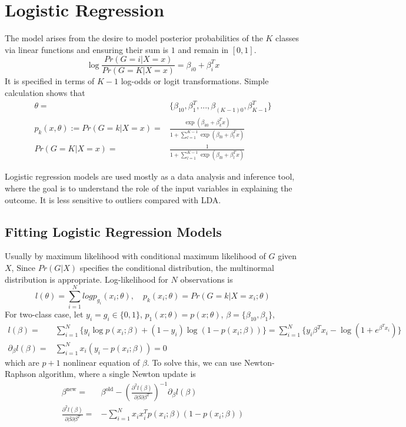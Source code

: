 \section{Logistic Regression}
The model arises from the desire to model posterior probabilities of the $K$ classes
via linear functions and ensuring their sum is $1$ and remain in $[0,1]$. 
\begin{equation*}
\log\frac{Pr(G=i|X=x)}{Pr(G=K|X=x)}=\beta_{i0}+\beta_i^Tx
\end{equation*}
It is specified in terms of $K-1$ log-odds or logit transformations. Simple calculation
shows that
\begin{align*}
\theta=&\{\beta_{10}, \beta_1^T, ..., \beta_{(K-1)0}, \beta_{K-1}^T\}\\
p_k(x,\theta):=Pr(G=k|X=x)=&\frac{\exp(\beta_{k0}+\beta_k^Tx)}{1+\sum_{l=1}^{K-1}\exp(\beta_{l0}+
\beta_l^Tx)}\\
Pr(G=K|X=x)=&\frac{1}{1+\sum_{l=1}^{K-1}\exp(\beta_{l0}+\beta_l^Tx)}
\end{align*}

Logistic regression models are used mostly as a data analysis and inference tool, 
where the goal is to understand the role of the input variables in explaining the 
outcome. It is less sensitive to outliers compared with LDA. 

\subsection{Fitting Logistic Regression Models}
Usually by maximum likelihood with conditional maximum likelihood of $G$ given $X$, 
Since $Pr(G|X)$ specifies the conditional distribution, the multinormal distribution
is appropriate. Log-likelihood for $N$ observations is 
\begin{equation*}
l(\theta)=\sum_{i=1}^N logp_{g_i}(x_i;\theta),\quad p_k(x_i;\theta)=
Pr(G=k|X=x_i;\theta)
\end{equation*}
For two-class case, let $y_i=g_i\in\{0,1\}$, $p_1(x;\theta)=p(x;\theta)$, $\beta=\{
\beta_{10}, \beta_1\}$, 
\begin{align*}
l(\beta)=&\sum_{i=1}^N\{y_i\log p(x_i;\beta)+(1-y_i)\log (1-p(x_i;\beta))\}
=\sum_{i=1}^N\{y_i\beta^Tx_i-\log(1+e^{\beta^Tx_i})\}\\
\partial_\beta l(\beta)=&\sum_{i=1}^N x_i(y_i-p(x_i;\beta))=0
\end{align*}
which are $p+1$ nonlinear equation of $\beta$. 
To solve this, we can use Newton-Raphson algorithm, where a single Newton update is
\begin{align*}
\beta^{\text{new}}=&\beta^{\text{old}}-\left(\frac{\partial^2l(\beta)}{\partial\beta
\partial\beta^T}\right)^{-1}\partial_\beta l(\beta)\\
\frac{\partial^2l(\beta)}{\partial\beta\partial\beta^T}=&
-\sum_{i=1}^Nx_ix_i^Tp(x_i;\beta)(1-p(x_i;\beta))
\end{align*}

